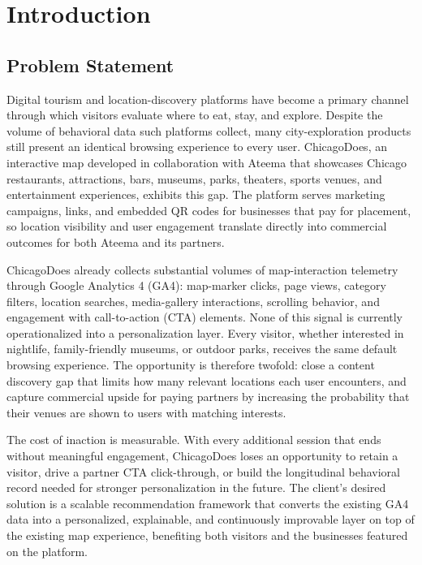 \documentclass[12pt,letterpaper]{article}
\begin{document}
\setcounter{page}{1}
\pagestyle{body}

\section{Introduction}\label{sec:intro}

\subsection{Problem Statement}\label{sec:problem}

Digital tourism and location-discovery platforms have become a primary
channel through which visitors evaluate where to eat, stay, and
explore. Despite the volume of behavioral data such platforms collect,
many city-exploration products still present an identical browsing
experience to every user. ChicagoDoes, an interactive map developed in
collaboration with Ateema that showcases Chicago restaurants,
attractions, bars, museums, parks, theaters, sports venues, and
entertainment experiences, exhibits this gap. The platform serves
marketing campaigns, links, and embedded QR codes for businesses that
pay for placement, so location visibility and user engagement translate
directly into commercial outcomes for both Ateema and its partners.

ChicagoDoes already collects substantial volumes of map-interaction
telemetry through Google Analytics 4 (GA4): map-marker clicks, page
views, category filters, location searches, media-gallery interactions,
scrolling behavior, and engagement with call-to-action (CTA) elements.
None of this signal is currently operationalized into a personalization
layer. Every visitor, whether interested in nightlife, family-friendly
museums, or outdoor parks, receives the same default browsing
experience. The opportunity is therefore twofold: close a content
discovery gap that limits how many relevant locations each user
encounters, and capture commercial upside for paying partners by
increasing the probability that their venues are shown to users with
matching interests.

The cost of inaction is measurable. With every additional session that
ends without meaningful engagement, ChicagoDoes loses an opportunity
to retain a visitor, drive a partner CTA click-through, or build the
longitudinal behavioral record needed for stronger personalization in
the future. The client's desired solution is a scalable recommendation
framework that converts the existing GA4 data into a personalized,
explainable, and continuously improvable layer on top of the existing
map experience, benefiting both visitors and the businesses featured
on the platform.
\end{document}

